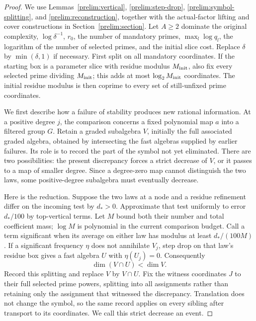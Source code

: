 \begin{proof}
We use Lemmas~\ref{prelim:vertical}, \ref{prelim:step-drop},
\ref{prelim:symbol-splitting}, and \ref{prelim:reconstruction}, together
with the actual-factor lifting and cover constructions in
Section~\ref{prelim:section}.  Let $A\ge2$ dominate the original
complexity, $\log\delta^{-1}$, $r_0$, the number of mandatory primes,
$\max_l\log q_l$, the logarithm of the number of selected primes, and
the initial slice cost.  Replace $\delta$ by $\min(\delta,1)$ if
necessary.  First split on all mandatory coordinates.  If the
starting box is a parameter slice with residue modulus $M_{\rm init}$,
also fix every selected prime dividing $M_{\rm init}$; this adds at
most $\log_2 M_{\rm init}$ coordinates.  The initial residue modulus
is then coprime to every set of still-unfixed prime coordinates.

We first describe how a failure of stability produces new rational
information.  At a positive degree $j$, the comparison concerns a
fixed polynomial map $a$ into a filtered group $G$.  Retain a graded
subalgebra $V$, initially the full associated graded algebra, obtained
by intersecting the fast algebras supplied by earlier failures.
Its role is to record the part of the symbol not yet eliminated.
There are two possibilities: the present discrepancy forces a strict
decrease of $V$, or it passes to a map of smaller degree.  Since a
degree-zero map cannot distinguish the two laws, some positive-degree
subalgebra must eventually decrease.

Here is the reduction.  Suppose the two laws at a node and a residue
refinement differ on the incoming test by $d_*>0$.  Approximate that
test uniformly to error $d_*/100$ by top-vertical terms.  Let $M$
bound both their number and total coefficient mass; $\log M$ is
polynomial in the current comparison budget.  Call a term
significant when its average on either law has modulus at least
$d_*/(100M)$.  If a significant frequency $\eta$ does not annihilate
$V_j$, step drop on that law's residue box gives a fast algebra $U$
with $\eta(U_j)=0$.  Consequently
\[
                         \dim(V\cap U)<\dim V.
\]
Record this splitting and replace $V$ by $V\cap U$.  Fix the witness
coordinates $J$ to their full selected prime powers, splitting into
all assignments rather than retaining only the assignment that
witnessed the discrepancy.  Translation does not change the symbol,
so the same record applies on every sibling after transport to its
coordinates.  We call this strict decrease an event.


\end{proof}
